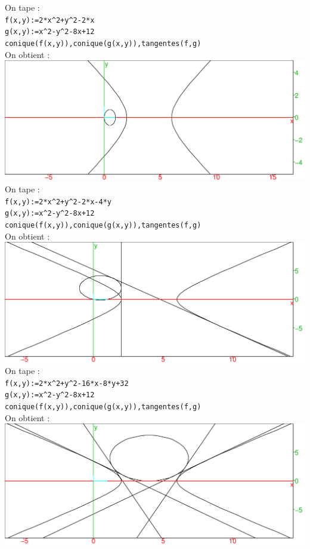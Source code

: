 \documentclass[a4paper,11pt]{book}
\begin{document}
On tape :\\
{\tt f(x,y):=2*x\verb|^|2+y\verb|^|2-2*x}\\
{\tt g(x,y):=x\verb|^|2-y\verb|^|2-8x+12}\\
{\tt conique(f(x,y)),conique(g(x,y)),tangentes(f,g)}\\
On obtient :\\
\includegraphics[width=\textwidth]{tangentes0}\\
On tape :\\
{\tt f(x,y):=2*x\verb|^|2+y\verb|^|2-2*x-4*y}\\
{\tt g(x,y):=x\verb|^|2-y\verb|^|2-8x+12}\\
{\tt conique(f(x,y)),conique(g(x,y)),tangentes(f,g)}\\
On obtient :\\
\includegraphics[width=\textwidth]{tangentes3}
On tape :\\
{\tt f(x,y):=2*x\verb|^|2+y\verb|^|2-16*x-8*y+32}\\
{\tt g(x,y):=x\verb|^|2-y\verb|^|2-8x+12}\\
{\tt conique(f(x,y)),conique(g(x,y)),tangentes(f,g)}\\
On obtient :\\
\includegraphics[width=\textwidth]{tangentes4}
\end{document}
